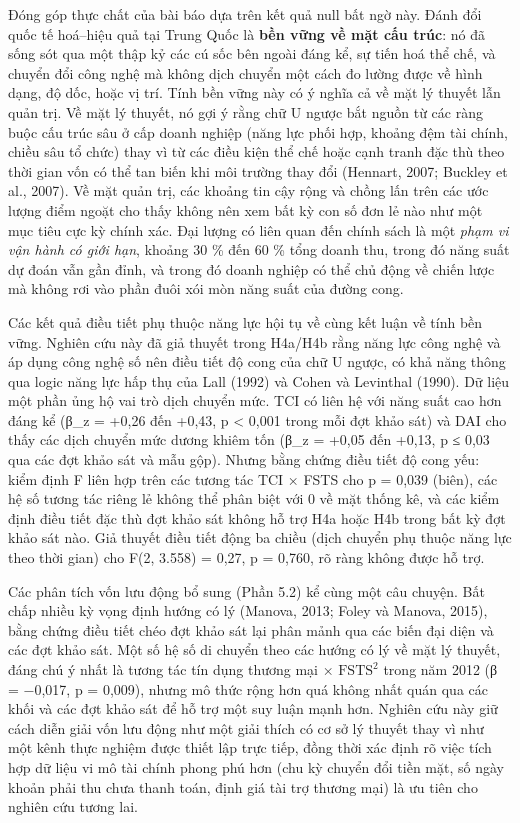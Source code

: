 \documentclass[12pt,a4paper]{article}
\begin{document}
Đóng góp thực chất của bài báo dựa trên kết quả null bất ngờ này. Đánh
đổi quốc tế hoá--hiệu quả tại Trung Quốc là \textbf{bền vững về mặt cấu
trúc}: nó đã sống sót qua một thập kỷ các cú sốc bên ngoài đáng kể, sự
tiến hoá thể chế, và chuyển đổi công nghệ mà không dịch chuyển một cách
đo lường được về hình dạng, độ dốc, hoặc vị trí. Tính bền vững này có ý
nghĩa cả về mặt lý thuyết lẫn quản trị. Về mặt lý thuyết, nó gợi ý rằng
chữ U ngược bắt nguồn từ các ràng buộc cấu trúc sâu ở cấp doanh nghiệp
(năng lực phối hợp, khoảng đệm tài chính, chiều sâu tổ chức) thay vì từ
các điều kiện thể chế hoặc cạnh tranh đặc thù theo thời gian vốn có thể
tan biến khi môi trường thay đổi (Hennart, 2007; Buckley et al., 2007).
Về mặt quản trị, các khoảng tin cậy rộng và chồng lấn trên các ước lượng
điểm ngoặt cho thấy không nên xem bất kỳ con số đơn lẻ nào như một mục
tiêu cực kỳ chính xác. Đại lượng có liên quan đến chính sách là một
\emph{phạm vi vận hành có giới hạn}, khoảng 30 \% đến 60 \% tổng doanh
thu, trong đó năng suất dự đoán vẫn gần đỉnh, và trong đó doanh nghiệp
có thể chủ động về chiến lược mà không rơi vào phần đuôi xói mòn năng
suất của đường cong.

Các kết quả điều tiết phụ thuộc năng lực hội tụ về cùng kết luận về tính
bền vững. Nghiên cứu này đã giả thuyết trong H4a/H4b rằng năng lực công
nghệ và áp dụng công nghệ số nên điều tiết độ cong của chữ U ngược, có
khả năng thông qua logic năng lực hấp thụ của Lall (1992) và Cohen và
Levinthal (1990). Dữ liệu một phần ủng hộ vai trò dịch chuyển mức. TCI
có liên hệ với năng suất cao hơn đáng kể (β\_z = +0,26 đến +0,43, p
\textless{} 0,001 trong mỗi đợt khảo sát) và DAI cho thấy các dịch
chuyển mức dương khiêm tốn (β\_z = +0,05 đến +0,13, p ≤ 0,03 qua các đợt
khảo sát và mẫu gộp). Nhưng bằng chứng điều tiết độ cong yếu: kiểm định
F liên hợp trên các tương tác TCI × FSTS cho p = 0,039 (biên), các hệ số
tương tác riêng lẻ không thể phân biệt với 0 về mặt thống kê, và các
kiểm định điều tiết đặc thù đợt khảo sát không hỗ trợ H4a hoặc H4b trong
bất kỳ đợt khảo sát nào. Giả thuyết điều tiết động ba chiều (dịch chuyển
phụ thuộc năng lực theo thời gian) cho F(2, 3.558) = 0,27, p = 0,760, rõ
ràng không được hỗ trợ.

Các phân tích vốn lưu động bổ sung (Phần 5.2) kể cùng một câu chuyện.
Bất chấp nhiều kỳ vọng định hướng có lý (Manova, 2013; Foley và Manova,
2015), bằng chứng điều tiết chéo đợt khảo sát lại phân mảnh qua các biến
đại diện và các đợt khảo sát. Một số hệ số di chuyển theo các hướng có
lý về mặt lý thuyết, đáng chú ý nhất là tương tác tín dụng thương mại ×
\(\mathrm{FSTS}^2\) trong năm 2012 (β = −0,017, p = 0,009), nhưng mô
thức rộng hơn quá không nhất quán qua các khối và các đợt khảo sát để hỗ
trợ một suy luận mạnh hơn. Nghiên cứu này giữ cách diễn giải vốn lưu
động như một giải thích có cơ sở lý thuyết thay vì như một kênh thực
nghiệm được thiết lập trực tiếp, đồng thời xác định rõ việc tích hợp dữ
liệu vi mô tài chính phong phú hơn (chu kỳ chuyển đổi tiền mặt, số ngày
khoản phải thu chưa thanh toán, định giá tài trợ thương mại) là ưu tiên
cho nghiên cứu tương lai.
\end{document}
